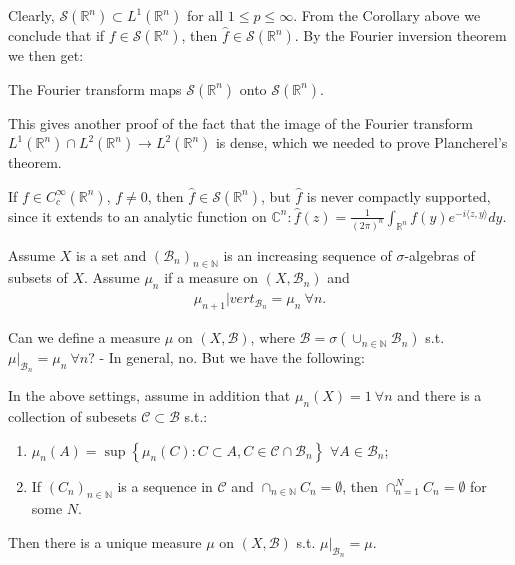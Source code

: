 Clearly, \(\mathcal{S}(\mathbb{R}^n)\subset L^{1}(\mathbb{R}^n)\) for all \(1\leq p\leq\infty\). From the Corollary above we conclude that if \(f\in\mathcal{S}(\mathbb{R}^n)\), then \(\hat{f}\in\mathcal{S}(\mathbb{R}^n)\). By the Fourier inversion theorem we then get:
\begin{theorem}
    The Fourier transform maps \(\mathcal{S}(\mathbb{R}^n)\) onto \(\mathcal{S}(\mathbb{R}^n)\).
\end{theorem}
\begin{remark}
    This gives another proof of the fact that the image of the Fourier transform \(L^1(\mathbb{R}^n)\cap L^2(\mathbb{R}^n)\rightarrow L^2(\mathbb{R}^n)\) is dense, which we needed to prove Plancherel's theorem.
\end{remark}
\begin{remark}
    If \(f\in C^{\infty}_{c}(\mathbb{R}^n)\), \(f\neq 0\), then \(\hat{f}\in\mathcal{S}(\mathbb{R}^n)\), but \(\hat{f}\) is never compactly supported, since it extends to an analytic function on \(\mathbb{C}^n: \hat{f}(z)=\frac{1}{(2\pi)^n}\int_{\mathbb{R}^n}f(y)e^{-i\langle z,y\rangle}dy\).
\end{remark}
\begin{theorem}
    Assume \(X\) is a set and \((\mathcal{B}_n)_{n\in\mathbb{N}}\) is an increasing sequence of \(\sigma\)-algebras of subsets of \(X\). Assume \(\mu_n\) if a measure on \((X,\mathcal{B}_n)\) and 
    \begin{align*}
        \mu_{n+1} |vert_{\mathcal{B}_n} = \mu_n \ \forall n.
    \end{align*}
\end{theorem}
Can we define a measure \(\mu\) on \((X,\mathcal{B})\), where \(\mathcal{B}=\sigma\left(\cup_{n\in\mathbb{N}}\mathcal{B}_n\right)\) s.t. \(\mu\vert_{\mathcal{B}_n}=\mu_n \ \forall n\)? - In general, no. But we have the following:
\begin{theorem}
    In the above settings, assume in addition that \(\mu_n(X)=1\ \forall n\) and there is a collection of subesets \(\mathcal{C}\subset\mathcal{B}\) s.t.:
    \begin{enumerate}[label=(\roman*)]
        \item \(\mu_n(A)=\sup\left\{ \mu_n(C): C\subset A, C\in\mathcal{C}\cap \mathcal{B}_n \right\}\) \(\forall A\in\mathcal{B}_n\);
        \item If \((C_n)_{n\in\mathbb{N}}\) is a sequence in \(\mathcal{C}\) and \(\cap_{n\in\mathbb{N}}C_n=\emptyset\), then \(\cap_{n=1}^{N}C_n=\emptyset\) for some \(N\). 
    \end{enumerate}
    Then there is a unique measure \(\mu\) on \((X,\mathcal{B})\) s.t. \(\mu\vert_{\mathcal{B}_n} = \mu\).
\end{theorem}